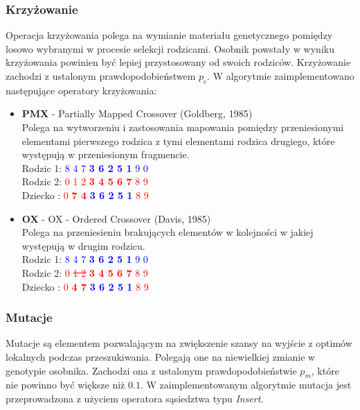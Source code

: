 \documentclass[12pt]{article}
\begin{document}
\subsubsection{Krzyżowanie}
Operacja krzyżowania polega na wymianie materiału genetycznego pomiędzy losowo wybranymi w procesie selekcji rodzicami.
Osobnik powstały w wyniku krzyżowania powinien być lepiej przystosowany od swoich rodziców. Krzyżowanie zachodzi z
ustalonym prawdopodobieństwem $p_c$. W algorytmie zaimplementowano następujące operatory krzyżowania:
\begin{itemize}
    \item \textbf{PMX} - Partially Mapped Crossover (Goldberg, 1985)\\
    Polega na wytworzeniu i zastosowania mapowania pomiędzy przeniesionymi elementami pierwszego rodzica z tymi elementami rodzica drugiego, które występują w przeniesionym fragmencie.
    \\
        Rodzic 1: \textcolor{blue}{8 4 7 \textbf{3 6 2 5 1} 9 0}
        \\
        Rodzic 2: \textcolor{red}{0 1 2 \textbf{3 4 5 6 7} 8 9}\\
        Dziecko : \textcolor{red}{0 \textbf{7 4}} \textcolor{blue}{\textbf{3 6 2 5 1}} \textcolor{red}{8 9}
    \item \textbf{OX} - OX - Ordered Crossover (Davis, 1985)\\
    Polega na przeniesieniu brakujących elementów w kolejności w jakiej występują w drugim rodzicu.
    \\
    Rodzic 1: \textcolor{blue}{8 4 7 \textbf{3 6 2 5 1} 9 0}
    \\
    Rodzic 2: \textcolor{red}{0 \sout{1 2} \textbf{3 4 5 6 7} 8 9}\\
    Dziecko : \textcolor{red}{0 \textbf{4 7}} \textcolor{blue}{\textbf{3 6 2 5 1}} \textcolor{red}{8 9}
\end{itemize}

\clearpage

\subsubsection{Mutacje}
Mutacje są elementem pozwalającym na zwiększenie szansy na wyjście z optimów lokalnych podczas przeszukiwania.
Polegają one na niewielkiej zmianie w genotypie osobnika. Zachodzi ona z ustalonym prawdopodobieństwie $p_m$, które nie powinno
być większe niż $0.1$. W zaimplementowanym algorytmie mutacja jest przeprowadzona z użyciem operatora sąsiedztwa typu \textit{Insert}.
\end{document}
